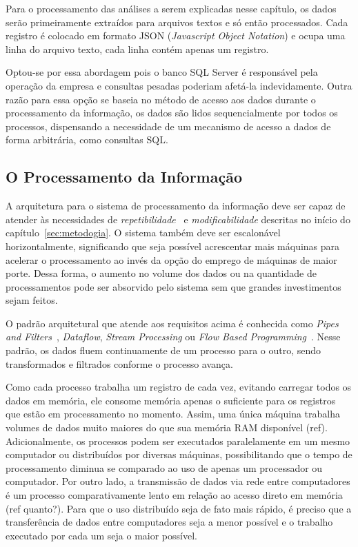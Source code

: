 \documentclass[12pt,a4paper]{article}
\begin{document}
Para o processamento das análises a serem explicadas nesse capítulo, os dados serão primeiramente extraídos para arquivos textos e só então processados. Cada registro é colocado em formato JSON (\textit{Javascript Object Notation}) e ocupa uma linha do arquivo texto, cada linha contém apenas um registro. %

Optou-se por essa abordagem pois o banco SQL Server é responsável pela operação da empresa e consultas pesadas poderiam afetá-la indevidamente. Outra razão para essa opção se baseia no método de acesso aos dados durante o processamento da informação, os dados são lidos sequencialmente por todos os processos, dispensando a necessidade de um mecanismo de acesso a dados de forma arbitrária, como consultas SQL.

\subsection{O Processamento da Informação}

A arquitetura para o sistema de processamento da informação deve ser capaz de atender às necessidades de \textit{repetibilidade}~ e \textit{modificabilidade} descritas no início do capítulo~\ref{sec:metodogia}. O sistema também deve ser escalonável horizontalmente, significando que seja possível acrescentar mais máquinas para acelerar o processamento ao invés da opção do emprego de máquinas de maior porte. Dessa forma, o aumento no volume dos dados ou na quantidade de processamentos pode ser absorvido pelo sistema sem que grandes investimentos sejam feitos. %

O padrão arquitetural que atende aos requisitos acima é conhecida como \textit{Pipes and Filters}~\cite{Hohpe2003-nj}, \textit{Dataflow}, \textit{Stream Processing} ou \textit{Flow Based Programming}~\cite{Morrison2010-pm}. Nesse padrão, os dados fluem continuamente de um processo para o outro, sendo transformados e filtrados conforme o processo avança. 

Como cada processo trabalha um registro de cada vez, evitando carregar todos os dados em memória, ele consome memória apenas o suficiente para os registros que estão em processamento no momento. Assim, uma única máquina trabalha volumes de dados muito maiores do que sua memória RAM disponível (ref). Adicionalmente, os processos podem ser executados paralelamente em um mesmo computador ou distribuídos por diversas máquinas, possibilitando que o tempo de processamento diminua se comparado ao uso de apenas um processador ou computador. Por outro lado, a transmissão de dados via rede entre computadores é um processo comparativamente lento em relação ao acesso direto em memória (ref quanto?). Para que o uso distribuído seja de fato mais rápido, é preciso que a transferência de dados entre computadores seja a menor possível e o trabalho executado por cada um seja o maior possível.
\end{document}
